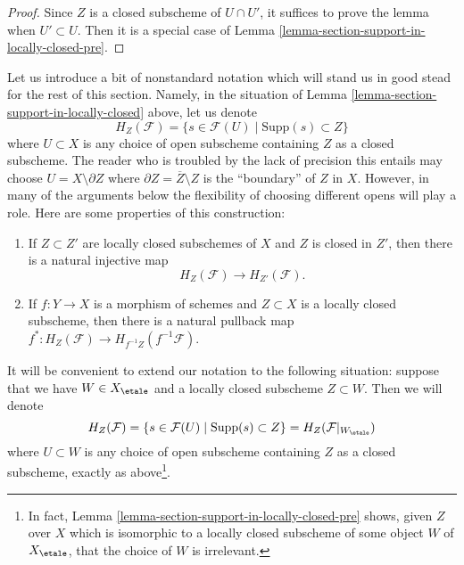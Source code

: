 \begin{proof}
Since $Z$ is a closed subscheme of $U \cap U'$, it suffices to
prove the lemma when $U' \subset U$. Then it is a special case
of Lemma \ref{lemma-section-support-in-locally-closed-pre}.
\end{proof}

\noindent
Let us introduce a bit of nonstandard notation which will stand us
in good stead for the rest of this section. Namely, in the situation
of Lemma \ref{lemma-section-support-in-locally-closed} above, let us denote
$$
H_Z(\mathcal{F}) = \{s \in \mathcal{F}(U) \mid \text{Supp}(s) \subset Z\}
$$
where $U \subset X$ is any choice of open subscheme containing $Z$ as a closed
subscheme. The reader who is troubled by the lack of precision this entails
may choose $U = X \setminus \partial Z$ where
$\partial Z = \overline{Z}\setminus Z$ is the ``boundary'' of $Z$ in $X$.
However, in many of the arguments below the flexibility of choosing
different opens will play a role. Here are some properties of this
construction:
\begin{enumerate}
\item
\label{item-inclusion}
If $Z \subset Z'$ are locally closed subschemes of $X$ and $Z$ is
closed in $Z'$, then there is a natural injective map
$$
H_Z(\mathcal{F}) \to H_{Z'}(\mathcal{F}).
$$
\item
\label{item-pullback}
If $f : Y \to X$ is a morphism of schemes and $Z \subset X$ is a locally
closed subscheme, then there is a natural
pullback map $f^* : H_Z(\mathcal{F}) \to H_{f^{-1}Z}(f^{-1}\mathcal{F})$.
\end{enumerate}
It will be convenient to extend our notation to the following situation:
suppose that we have $W \in X_\etale$ and a locally closed subscheme
$Z \subset W$. Then we will denote
$$
H_Z(\mathcal{F}) =
\{s \in \mathcal{F}(U) \mid \text{Supp}(s) \subset Z\} =
H_Z(\mathcal{F}|_{W_\etale})
$$
where $U \subset W$ is any choice of open subscheme containing $Z$
as a closed subscheme, exactly as above\footnote{In fact,
Lemma \ref{lemma-section-support-in-locally-closed-pre}
shows, given $Z$ over $X$ which is isomorphic to a locally closed
subscheme of some object $W$ of $X_\etale$, that
the choice of $W$ is irrelevant.}.

